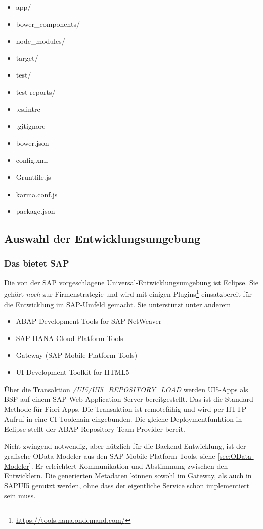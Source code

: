 \begin{itemize}
	\item app/
	\item bower\_components/
	\item node\_modules/
	\item target/	
	\item test/
	\item test-reports/
	\item .eslintrc
	\item .gitignore
	\item bower.json
	\item config.xml
	\item Gruntfile.js
	\item karma.conf.js	
	\item package.json
\end{itemize}
\subsection{Auswahl der Entwicklungsumgebung}
\label{sec:auswahl_ide}

\subsubsection{Das bietet SAP}
Die von der SAP vorgeschlagene Universal-Entwicklungsumgebung ist Eclipse. Sie gehört \textit{noch} zur Firmenstrategie und wird mit einigen Plugins\footnote{\url{https://tools.hana.ondemand.com/}} einsatzbereit für die Entwicklung im SAP-Umfeld gemacht. Sie unterstützt unter anderem 
\begin{itemize}
	\item ABAP Development Tools for SAP NetWeaver
	\item SAP HANA Cloud Platform Tools
	\item Gateway (SAP Mobile Platform Tools)
	\item UI Development Toolkit for HTML5
\end{itemize}
Über die Transaktion \textit{/UI5/UI5\_REPOSITORY\_LOAD} werden UI5-Apps als \ac{BSP} auf einem SAP Web Application Server bereitgestellt. Das ist die Standard-Methode für Fiori-Apps. Die Transaktion ist remotefähig und wird per HTTP-Aufruf in eine CI-Toolchain eingebunden. Die gleiche Deploymentfunktion in Eclipse stellt der ABAP Repository Team Provider bereit.

Nicht zwingend notwendig, aber nützlich für die Backend-Entwicklung, ist der grafische OData Modeler aus den SAP Mobile Platform Tools, siehe \autoref{sec:OData-Modeler}. Er erleichtert Kommunikation und Abstimmung zwischen den Entwicklern. Die generierten Metadaten können sowohl im Gateway, als auch in SAPUI5 genutzt werden, ohne dass der eigentliche Service schon implementiert sein muss.

